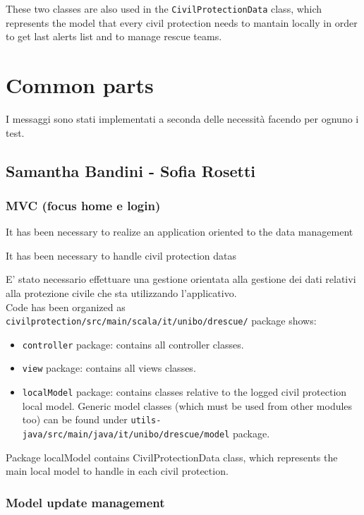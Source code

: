 \documentclass[a4paper,12pt]{report}
\begin{document}
These two classes are also used in the \texttt{CivilProtectionData} class, which represents the model that every civil protection needs to mantain locally in order to get last alerts list and to manage rescue teams.

\section{Common parts}
I messaggi sono stati implementati a seconda delle necessità facendo per ognuno i test.

\subsection{Samantha Bandini - Sofia Rosetti}

\subsubsection{MVC (focus home e login)}

It has been necessary to realize an application oriented to the data management %

It has been necessary to handle civil protection datas 

E' stato necessario effettuare una gestione orientata alla gestione dei dati relativi alla protezione civile che sta utilizzando l'applicativo.\\

Code has been organized as \texttt{civilprotection/src/main/scala/it/unibo/drescue/} package shows: 

\begin{itemize}
\item \texttt{controller} package: contains all controller classes.
\item \texttt{view} package: contains all views classes.
\item \texttt{localModel} package: contains classes relative to the logged civil protection local model. Generic model classes (which must be used from other modules too) can be found under \texttt{utils-java/src/main/java/it/unibo/drescue/model} package.
\end{itemize} 

Package localModel contains CivilProtectionData class, which represents the main local model to handle in each civil protection.


\subsubsection{Model update management}
\end{document}
